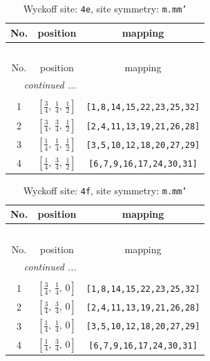 \documentclass[fleqn,8pt]{jsarticle}
\begin{document}
\begin{longtable}{ccc}
\caption{Wyckoff site: {\tt 4e}, site symmetry: {\tt m.mm'}}
 \\
 \hline \hline
No. & position & mapping \\ \hline \endfirsthead

\multicolumn{2}{l}{\tablename\ \thetable{}} \\
 \hline \hline
No. & position & mapping \\ \hline \endhead

 \hline \hline
\multicolumn{2}{r}{\footnotesize\it continued ...} \\ \endfoot

 \hline \hline
\multicolumn{2}{r}{} \\ \endlastfoot

1 & $\left[ \frac{3}{4},\, \frac{1}{4},\, \frac{1}{2} \right]$ & {\tt [1,8,14,15,22,23,25,32]} \\ \hline
2 & $\left[ \frac{3}{4},\, \frac{3}{4},\, \frac{1}{2} \right]$ & {\tt [2,4,11,13,19,21,26,28]} \\ \hline
3 & $\left[ \frac{1}{4},\, \frac{1}{4},\, \frac{1}{2} \right]$ & {\tt [3,5,10,12,18,20,27,29]} \\ \hline
4 & $\left[ \frac{1}{4},\, \frac{3}{4},\, \frac{1}{2} \right]$ & {\tt [6,7,9,16,17,24,30,31]} \\
\end{longtable}
\renewcommand{\arraystretch}{1.2}
\begin{longtable}{ccc}
\caption{Wyckoff site: {\tt 4f}, site symmetry: {\tt m.mm'}}
 \\
 \hline \hline
No. & position & mapping \\ \hline \endfirsthead

\multicolumn{2}{l}{\tablename\ \thetable{}} \\
 \hline \hline
No. & position & mapping \\ \hline \endhead

 \hline \hline
\multicolumn{2}{r}{\footnotesize\it continued ...} \\ \endfoot

 \hline \hline
\multicolumn{2}{r}{} \\ \endlastfoot

1 & $\left[ \frac{3}{4},\, \frac{1}{4},\, 0 \right]$ & {\tt [1,8,14,15,22,23,25,32]} \\ \hline
2 & $\left[ \frac{3}{4},\, \frac{3}{4},\, 0 \right]$ & {\tt [2,4,11,13,19,21,26,28]} \\ \hline
3 & $\left[ \frac{1}{4},\, \frac{1}{4},\, 0 \right]$ & {\tt [3,5,10,12,18,20,27,29]} \\ \hline
4 & $\left[ \frac{1}{4},\, \frac{3}{4},\, 0 \right]$ & {\tt [6,7,9,16,17,24,30,31]} \\
\end{longtable}
\end{document}
